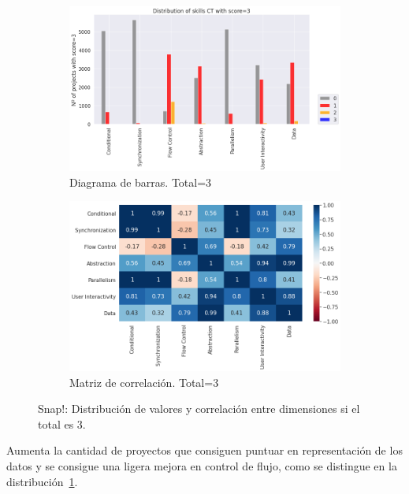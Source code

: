 \documentclass[a4paper, 12pt]{book}
\begin{document}
\begin{figure}[H]
    \centering
    \begin{subfigure}[h]{.49\textwidth} 
        \includegraphics[width=\textwidth]{img/distribucion_3_Snap}
        \caption{Diagrama de barras. Total=3}
        \label{fig:total3_Snap}
    \end{subfigure}       
    \begin{subfigure}[h]{.49\textwidth} 
        \includegraphics[width=\textwidth]{img/corr_3_Snap}
        \caption{Matriz de correlación. Total=3}
        \label{fig:corr3_Snap}
    \end{subfigure}
     \caption{Snap!: Distribución de valores y correlación entre dimensiones si el total es 3.}
\end{figure}

Aumenta la cantidad de proyectos que consiguen puntuar en representación de los datos y se consigue una ligera mejora en control de flujo, como se distingue en la distribución~\ref{fig:total3_Snap}.
\end{document}
